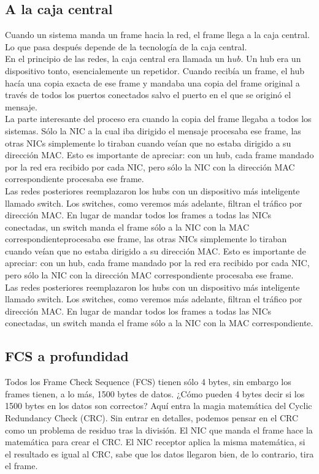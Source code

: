 \documentclass[12pt]{report}
\begin{document}
\subsection{A la caja central}
Cuando un sistema manda un frame hacia la red, el frame llega a la caja central.
Lo que pasa después depende de la tecnología de la caja central.\\
En el principio de las redes, la caja central era llamada un $\textit{hub}$. 
Un hub era un dispositivo tonto, esencialemente un repetidor. Cuando recibía
un frame, el hub hacía una copia exacta de ese frame y mandaba una copia del
frame original a través de todos los puertos conectados salvo el puerto en el que
se originó el mensaje.\\
La parte interesante del proceso era cuando la copia del frame llegaba a todos
los sistemas. Sólo la NIC a la cual iba dirigido el mensaje procesaba ese frame,
las otras NICs simplemente lo tiraban cuando veían que no estaba dirigido 
a su dirección MAC. Esto es importante de apreciar: con un hub, cada frame mandado 
por la red era recibido por cada NIC, pero sólo la NIC con la dirección MAC 
correspondiente procesaba ese frame.\\
Las redes posteriores reemplazaron los hubs con un dispositivo más inteligente 
llamado switch. Los switches, como veremos más adelante, filtran el tráfico por dirección MAC.
En lugar de mandar todos los frames a todas las NICs conectadas, un switch 
manda el frame sólo a la NIC con la MAC correspondienteprocesaba ese frame,
las otras NICs simplemente lo tiraban cuando veían que no estaba dirigido 
a su dirección MAC. Esto es importante de apreciar: con un hub, cada frame mandado 
por la red era recibido por cada NIC, pero sólo la NIC con la dirección MAC 
correspondiente procesaba ese frame.\\
Las redes posteriores reemplazaron los hubs con un dispositivo más inteligente 
llamado switch. Los switches, como veremos más adelante, filtran el tráfico por dirección MAC.
En lugar de mandar todos los frames a todas las NICs conectadas, un switch 
manda el frame sólo a la NIC con la MAC correspondiente.

\subsection{FCS a profundidad}
Todos los Frame Check Sequence (FCS) tienen sólo 4 bytes, sin embargo
los frames tienen, a lo más, 1500 bytes de datos. ¿Cómo pueden 
4 bytes decir si los 1500 bytes en los datos son correctos? 
Aquí entra la magia matemática del Cyclic Redundancy Check (CRC).
Sin entrar en detalles, podemos pensar en el CRC como un problema de
residuo tras la división. El NIC que manda el frame hace la matemática 
para crear el CRC. El NIC receptor aplica la misma matemática,
si el resultado es igual al CRC, sabe que los datos llegaron bien, de lo contrario,
tira el frame.
\end{document}
